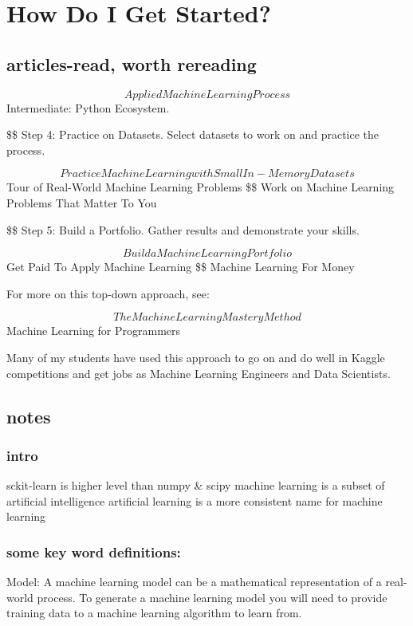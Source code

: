\documentclass[11pt]{article}
\begin{document}
\section{How Do I Get Started?}
\label{sec:org01190d1}

\subsection{articles-read, worth rereading}
\label{sec:orgcd57423}
$$ Applied Machine Learning Process
 $$ Intermediate: Python Ecosystem.

\$\$ Step 4: Practice on Datasets. Select datasets to work on and practice the process. 

$$ Practice Machine Learning with Small In-Memory Datasets
 $$ Tour of Real-World Machine Learning Problems
\$\$ Work on Machine Learning Problems That Matter To You

\$\$ Step 5: Build a Portfolio. Gather results and demonstrate your skills. 

$$ Build a Machine Learning Portfolio
 $$ Get Paid To Apply Machine Learning
\$\$ Machine Learning For Money

For more on this top-down approach, see:

$$ The Machine Learning Mastery Method
$$ Machine Learning for Programmers

Many of my students have used this approach to go on and do well in Kaggle competitions and get jobs as Machine Learning Engineers and Data Scientists.

\subsection{notes}
\label{sec:org9885175}

\subsubsection{intro}
\label{sec:orgce5e49f}
sckit-learn is higher level than numpy \& scipy
machine learning is a subset of artificial intelligence
artificial learning is a more consistent name for machine learning

\subsubsection{some key word definitions:}
\label{sec:org7dc374b}
Model: A machine learning model can be a mathematical representation
of a real-world process. To generate a machine learning model you will
need to provide training data to a machine learning algorithm to learn
from.
\end{document}
